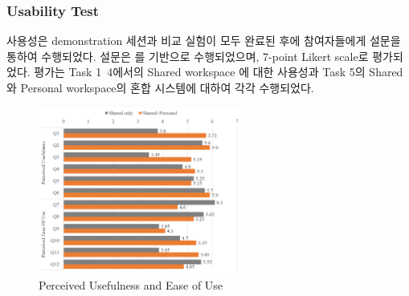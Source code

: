 



\subsubsection{Usability Test}
사용성은 demonstration 세션과 비교 실험이 모두 완료된 후에 참여자들에게 설문을 통하여 수행되었다. 설문은 \cite{perlman_user_2011}를 기반으로 수행되었으며, 7-point Likert scale로 평가되었다. 
평가는 Task 1~4에서의 Shared workspace 에 대한 사용성과 Task 5의 Shared와 Personal workspace의 혼합 시스템에 대하여 각각 수행되었다.


 \begin{figure}[b!]
\centering
\includegraphics[width=1.0\columnwidth, height=5.5cm]{5-Experiments/pueu}
\caption{Perceived Usefulness and Ease of Use}
\label{fig:pueu}
\end{figure}


